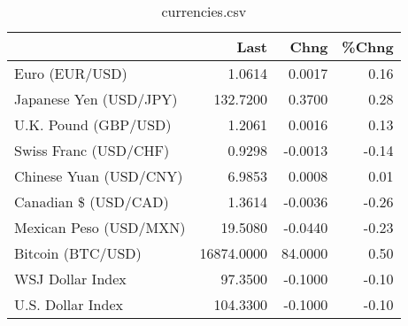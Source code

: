\documentclass{article}%
\begin{document}
%


\begin{table}[htbp]%
\caption{currencies.csv}%
\centering%
\begin{adjustbox}{width=1\textwidth}%
\begin{tabular}{lrrr}
\toprule
                       &       Last &    Chng &  \%Chng \\
\midrule
        Euro (EUR/USD) &     1.0614 &  0.0017 &   0.16 \\
Japanese Yen (USD/JPY) &   132.7200 &  0.3700 &   0.28 \\
  U.K. Pound (GBP/USD) &     1.2061 &  0.0016 &   0.13 \\
 Swiss Franc (USD/CHF) &     0.9298 & -0.0013 &  -0.14 \\
Chinese Yuan (USD/CNY) &     6.9853 &  0.0008 &   0.01 \\
  Canadian \$ (USD/CAD) &     1.3614 & -0.0036 &  -0.26 \\
Mexican Peso (USD/MXN) &    19.5080 & -0.0440 &  -0.23 \\
     Bitcoin (BTC/USD) & 16874.0000 & 84.0000 &   0.50 \\
      WSJ Dollar Index &    97.3500 & -0.1000 &  -0.10 \\
     U.S. Dollar Index &   104.3300 & -0.1000 &  -0.10 \\
\bottomrule
\end{tabular}
%
\end{adjustbox}%
\end{table}

%
\end{document}
